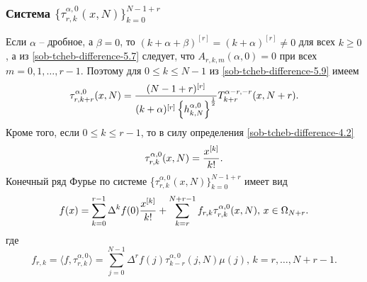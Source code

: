 \subsubsection{Система $\{\tau_{r,k}^{\alpha,0}(x,N)\}_{k=0}^{N-1+r}$}
 Если $\alpha$ -- дробное, а $\beta=0$,  то  $(k+\alpha+\beta)^{[r]}=(k+\alpha)^{[r]}\neq0$ для всех $k\ge 0$, а из \eqref{sob-tcheb-difference-5.7} следует, что $A_{r,k,m}(\alpha,0)=0$ при всех  $m=0,1,\dots, r-1$. Поэтому для $0\le k\le N-1$ из \eqref{sob-tcheb-difference-5.9}  имеем
\begin{equation}\label{sob-tcheb-difference-6.10}
\tau_{r,k+r}^{\alpha,0}(x,N)=
{(N-1+r)^{[r]}\over(k+\alpha)^{[r]}\left\{h_{k,N}^{\alpha,0}\right\}^{\frac12}}
T_{k+r}^{\alpha-r,-r}(x,N+r).
\end{equation}
Кроме того, если $0\le k\le r-1$, то в силу определения \eqref{sob-tcheb-difference-4.2}
\begin{equation}\label{sob-tcheb-difference-6.11}
\tau_{r,k}^{\alpha,0}(x,N)={x^{[k]}\over k!}.
\end{equation}
Конечный ряд Фурье по системе \{$ \tau_{r,k}^{\alpha,0}(x,N)\}_{k=0}^{N-1+r} $  имеет вид
  \begin{equation}\label{sob-tcheb-difference-6.12}
 f(x)= \sum_{k=0}^{r-1}\Delta^kf(0){x^{[k]}\over k!} +\sum_{k=r}^{N+r-1}f_{r,k} \tau_{r,k}^{\alpha,0}(x,N),\, x\in \Omega_{N+r}.
  \end{equation}
где
\begin{equation}\label{sob-tcheb-difference-6.13}
f_{r,k}=
\langle f,\tau_{r,k}^{\alpha,0} \rangle=
\sum_{j=0}^{N-1}\Delta^rf(j)\tau_{k-r}^{\alpha,0}(j,N)\mu(j),\, k=r,\ldots, N+r-1.
 \end{equation}
